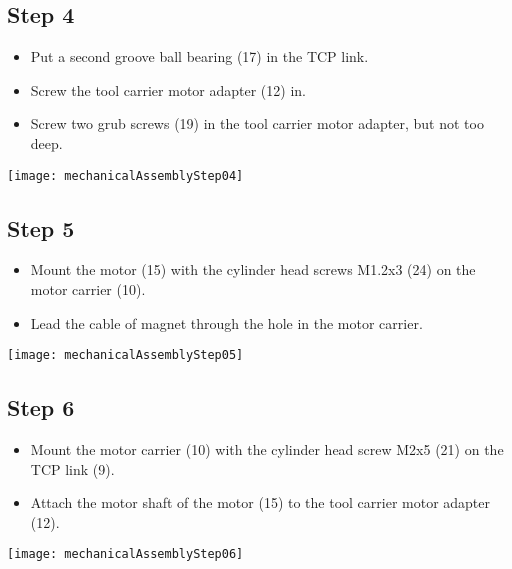 \subsection*{Step 4}

\begin{minipage}[t]{0.6\textwidth}
	\begin{itemize}
		\item Put a second groove ball bearing (17) in the TCP link.
		\item Screw the tool carrier motor adapter (12) in.
		\item Screw two grub screws (19) in the tool carrier motor adapter, but not too deep.
	\end{itemize}
\end{minipage}
\hfill
\begin{minipage}[t]{0.35\textwidth}
	\vspace{-\ht\strutbox}\texttt{[image: mechanicalAssemblyStep04]}
	\label{fig:MechanicalAssebmlyStep04} 
\end{minipage}

\subsection*{Step 5}

\begin{minipage}[t]{0.6\textwidth}
	\begin{itemize}
		\item Mount the motor (15) with the cylinder head screws M1.2x3 (24) on the motor carrier (10).
		\item Lead the cable of magnet through the hole in the motor carrier.
	\end{itemize}
\end{minipage}
\hfill
\begin{minipage}[t]{0.35\textwidth}
	\vspace{-\ht\strutbox}\texttt{[image: mechanicalAssemblyStep05]}
	\label{fig:MechanicalAssebmlyStep05} 
\end{minipage}

\subsection*{Step 6}

\begin{minipage}[t]{0.6\textwidth}
	\begin{itemize}
		\item Mount the motor carrier (10) with the cylinder head screw M2x5 (21) on the TCP link (9). 
		\item Attach the motor shaft of the motor (15) to the tool carrier motor adapter (12).
	\end{itemize}
\end{minipage}
\hfill
\begin{minipage}[t]{0.35\textwidth}
	\vspace{-\ht\strutbox}\texttt{[image: mechanicalAssemblyStep06]}
	\label{fig:MechanicalAssebmlyStep06} 
\end{minipage}

